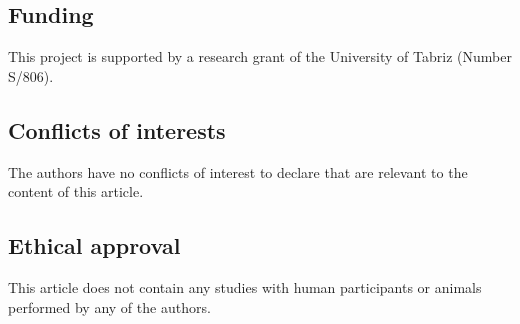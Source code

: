 \documentclass[review,3p]{elsarticle}
\begin{document}
\subsection*{Funding}
This project is supported by a research grant of the University of Tabriz (Number S/806).
\subsection*{Conflicts of interests}
The authors have no conflicts of interest to declare that are relevant to the content of this article.
\subsection*{Ethical approval}
This article does not contain any studies with human participants or animals performed by any of the authors.


\end{document}
